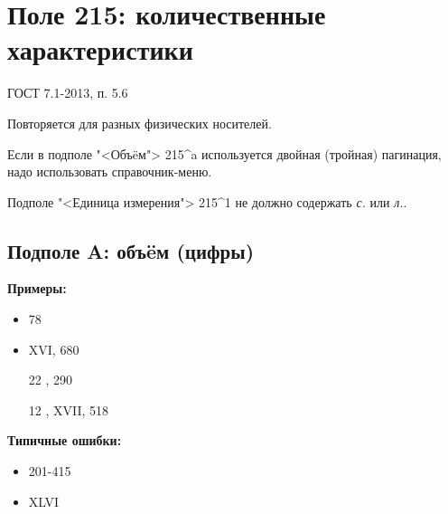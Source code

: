 \chapter{Поле 215: количественные характеристики}

ГОСТ 7.1-2013, п. 5.6 %

Повторяется для разных физических носителей.

Если в подполе "<Объ\"eм"> 215\^{}a используется двойная (тройная) пагинация, надо использовать справочник-меню.

Подполе "<Единица измерения"> 215\^{}1 не должно содержать \emph{с.} или \emph{л.}.

\section{Подполе A: объ\"eм (цифры)}

\textbf{Примеры:}

\begin{itemize}
    \item 78
    \item XVI, 680
    \item [22], 290
    \item [12], XVII, 518
\end{itemize}

\textbf{Типичные ошибки:}

\begin{itemize}
    \item 201-415
    \item XLVI
\end{itemize}


